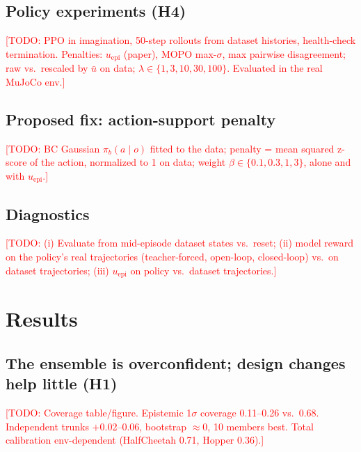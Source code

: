\documentclass[conference]{IEEEtran}
\newcommand{\todo}[1]{\textcolor{red}{[TODO: #1]}}
\newcommand{\uepi}{u_{\text{epi}}}
\begin{document}
\subsection{Policy experiments (H4)}
\todo{PPO in imagination, 50-step rollouts from dataset histories, health-check termination.
Penalties: $\uepi$ (paper), MOPO max-$\sigma$, max pairwise disagreement; raw vs.\ rescaled by
$\bar u$ on data; $\lambda\in\{1,3,10,30,100\}$. Evaluated in the real MuJoCo env.}

\subsection{Proposed fix: action-support penalty}
\todo{BC Gaussian $\pi_b(a\mid o)$ fitted to the data; penalty = mean squared z-score of the
action, normalized to 1 on data; weight $\beta\in\{0.1,0.3,1,3\}$, alone and with $\uepi$.}

\subsection{Diagnostics}
\todo{(i) Evaluate from mid-episode dataset states vs.\ reset; (ii) model reward on the
policy's real trajectories (teacher-forced, open-loop, closed-loop) vs.\ on dataset
trajectories; (iii) $\uepi$ on policy vs.\ dataset trajectories.}

\section{Results}
\label{sec:results}

\subsection{The ensemble is overconfident; design changes help little (H1)}
\todo{Coverage table/figure. Epistemic 1$\sigma$ coverage 0.11--0.26 vs.\ 0.68.
Independent trunks $+$0.02--0.06, bootstrap $\approx$0, 10 members best. Total calibration
env-dependent (HalfCheetah 0.71, Hopper 0.36).}

\begin{table}[t]
\centering
\caption{Uncertainty quality on held-out data (mean feedback, mean over 3 seeds).
\todo{fill from \texttt{results.csv}}}
\label{tab:uncertainty}
\end{table}
\end{document}
